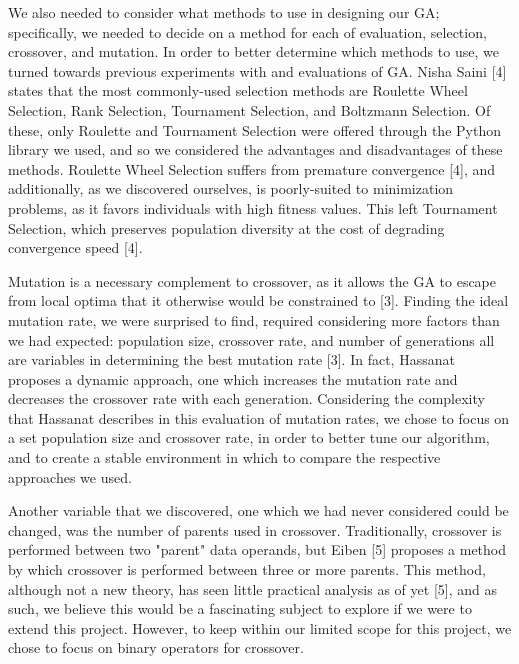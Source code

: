 \documentclass[12pt, conference]{IEEEtran}
\begin{document}
\par
We also needed to consider what methods to use in designing our GA; specifically, we needed to decide on a method for each of evaluation, selection, crossover, and mutation.
In order to better determine which methods to use, we turned towards previous experiments with and evaluations of GA.
Nisha Saini [4] states that the most commonly-used selection methods are Roulette Wheel Selection, Rank Selection, Tournament Selection, and Boltzmann Selection.
Of these, only Roulette and Tournament Selection were offered through the Python library we used, and so we considered the advantages and disadvantages of these methods.
Roulette Wheel Selection suffers from premature convergence [4], and additionally, as we discovered ourselves, is poorly-suited to minimization problems, as it favors individuals with high fitness values.
This left Tournament Selection, which preserves population diversity at the cost of degrading convergence speed [4].

\par
Mutation is a necessary complement to crossover, as it allows the GA to escape from local optima that it otherwise would be constrained to [3].
Finding the ideal mutation rate, we were surprised to find, required considering more factors than we had expected: population size, crossover rate, and number of generations all are variables in determining the best mutation rate [3].
In fact, Hassanat proposes a dynamic approach, one which increases the mutation rate and decreases the crossover rate with each generation.
Considering the complexity that Hassanat describes in this evaluation of mutation rates, we chose to focus on a set population size and crossover rate, in order to better tune our algorithm, and to create a stable environment in which to compare the respective approaches we used.

\par
Another variable that we discovered, one which we had never considered could be changed, was the number of parents used in crossover.
Traditionally, crossover is performed between two "parent" data operands, but Eiben [5] proposes a method by which crossover is performed between three or more parents.
This method, although not a new theory, has seen little practical analysis as of yet [5], and as such, we believe this would be a fascinating subject to explore if we were to extend this project.
However, to keep within our limited scope for this project, we chose to focus on binary operators for crossover.
\end{document}

